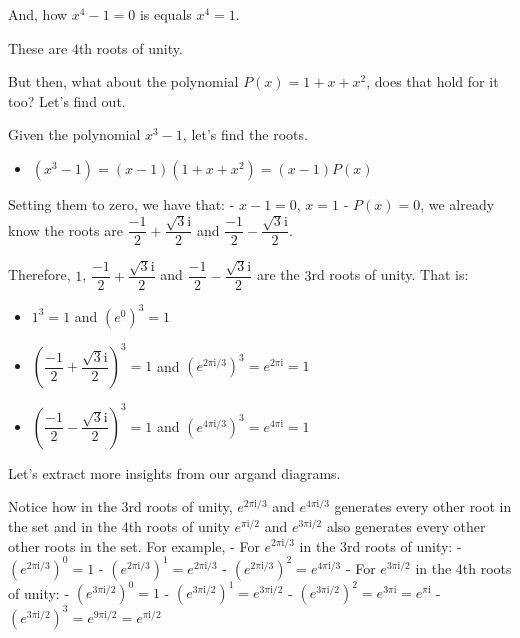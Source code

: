 \documentclass[11pt]{article}
\providecommand{\tightlist}{%
      \setlength{\itemsep}{0pt}\setlength{\parskip}{0pt}}
\begin{document}
And, how \(x^4 - 1 = 0\) is equals \(x^4 = 1\).

These are \(4\)th roots of unity.

But then, what about the polynomial \(P(x) = 1 + x + x^2\), does that
hold for it too? Let's find out.

Given the polynomial \(x^3 - 1\), let's find the roots.

\begin{itemize}
\tightlist
\item
  \((x^3 - 1) = (x - 1)(1 + x + x^2) = (x - 1)P(x)\)
\end{itemize}

Setting them to zero, we have that: - \(x - 1 = 0\), \(x = 1\) -
\(P(x) = 0\), we already know the roots are
\(\dfrac{-1}{2} + \dfrac{\sqrt{3}\mathrm{i}}{2}\) and
\(\dfrac{-1}{2} - \dfrac{\sqrt{3}\mathrm{i}}{2}\).

Therefore, \(1\), \(\dfrac{-1}{2} + \dfrac{\sqrt{3}\mathrm{i}}{2}\) and
\(\dfrac{-1}{2} - \dfrac{\sqrt{3}\mathrm{i}}{2}\) are the \(3\)rd roots
of unity. That is:

\begin{itemize}
\tightlist
\item
  \(1^3 = 1\) and \((e^0)^3 = 1\)
\item
  \((\dfrac{-1}{2} + \dfrac{\sqrt{3}\mathrm{i}}{2})^3 = 1\) and
  \((e^{2\pi\mathrm{i}/3})^3 = e^{2\pi\mathrm{i}} = 1\)
\item
  \((\dfrac{-1}{2} - \dfrac{\sqrt{3}\mathrm{i}}{2})^3 = 1\) and
  \((e^{4\pi\mathrm{i}/3})^3 = e^{4\pi\mathrm{i}} = 1\)
\end{itemize}

Let's extract more insights from our argand diagrams.

Notice how in the \(3\)rd roots of unity, \(e^{2\pi\mathrm{i}/3}\) and
\(e^{4\pi\mathrm{i}/3}\) generates every other root in the set and in
the \(4\)th roots of unity \(e^{\pi\mathrm{i}/{2}}\) and
\(e^{3\pi\mathrm{i}/{2}}\) also generates every other other roots in the
set. For example, - For \(e^{2\pi\mathrm{i}/3}\) in the \(3\)rd roots of
unity: - \((e^{2\pi\mathrm{i}/3})^ 0 = 1\) -
\((e^{2\pi\mathrm{i}/3})^ 1 = e^{2\pi\mathrm{i}/3}\) -
\((e^{2\pi\mathrm{i}/3})^ 2 = e^{4\pi\mathrm{i}/3}\) - For
\(e^{3\pi\mathrm{i}/{2}}\) in the \(4\)th roots of unity: -
\((e^{3\pi\mathrm{i}/{2}})^ 0 = 1\) -
\((e^{3\pi\mathrm{i}/{2}})^ 1 = e^{3\pi\mathrm{i}/{2}}\) -
\((e^{3\pi\mathrm{i}/{2}})^ 2 = e^{3\pi\mathrm{i}} = e^{\pi\mathrm{i}}\)
-
\((e^{3\pi\mathrm{i}/{2}})^ 3 = e^{9\pi\mathrm{i}/{2}} = e^{\pi\mathrm{i}/{2}}\)
\end{document}
